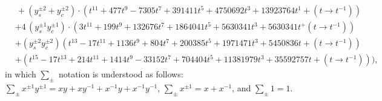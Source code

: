 \documentclass[letterpaper, 11pt]{article}
\newcommand{\nn}{\nonumber}
\begin{document}
{\begin{align}
  &\,+(y_s^{\pm2}+y_c^{\pm2}) \cdot (t^{11}+477t^{9}-7305t^7+391411t^5+4750692t^3+13923764t^{1}+ (t\rightarrow t^{-1}))\nn\\
  &+4\,(y_s^{\pm1}y_c^{\pm1})\cdot{(3t^{11}+199t^9+132676t^7+1864041t^5+5630341t^3+5630341t^+(t\rightarrow t^{-1}))}\nn\\
  &+(y_s^{\pm2}y_c^{\pm2})(t^{13}-17t^{11}+1136t^9+804t^7+200385t^5+1971471t^{3}+5450836t+(t\rightarrow t^{-1}))\nn\\
  &+(t^{15}-17t^{13}+214t^{11}+1414t^9-33152t^7+704404t^{5}+11381979t^{3}+35592757t+(t\rightarrow t^{-1}))\Big),\nn
\end{align}
in which $\sum_{\pm}$ notation is understood as follows: $\sum_{\pm}x^{\pm1}y^{\pm1} = xy+xy^{-1}+x^{-1}y+x^{-1}y^{-1}$, $\sum_{\pm}x^{\pm1} = x+x^{-1}$, and $\sum_{\pm} 1 = 1$.

}
\end{document}

